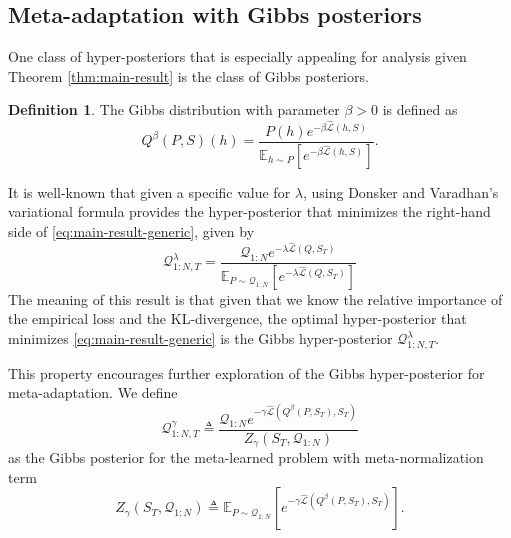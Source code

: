 \documentclass[letterpaper]{article} %
\theoremstyle{definition}
\newtheorem{defn}{Definition}[section]
\newcommand{\Expect}[2]{\mathbb{E}_{#1}\left [#2 \right ]}
\begin{document}

\subsection{Meta-adaptation with Gibbs posteriors} \label{sec:adapt-gibbs}

One class of hyper-posteriors that is especially appealing for analysis given Theorem \ref{thm:main-result} is the class of Gibbs posteriors.

\begin{defn} \label{defn:Gibbs}
	The Gibbs distribution with parameter $\beta>0$ is defined as 
	$$
	Q^\beta(P,S)(h)=\frac{P(h)e^{-\beta \hat{\mathcal{L}}(h,S)}}{\Expect{h\sim P}{e^{-\beta\hat{\mathcal{L}}(h,S)}}}.
	$$
\end{defn}

It is well-known \citep{Catoni2004} that given a specific value for $\lambda$, using Donsker and Varadhan’s variational formula \citep{Donsker1975} provides the hyper-posterior that minimizes the right-hand side of \eqref{eq:main-result-generic}, given by
%
\begin{equation*}
    \mathcal{Q}^{\lambda}_{1:N,T}=\frac{\mathcal{Q}_{1:N}e^{-\lambda\hat{\mathcal{L}}(Q,S_T)}}{\Expect{P\sim \mathcal{Q}_{1:N}}{e^{-\lambda\hat{\mathcal{L}}(Q,S_T)}}}
\end{equation*}
The meaning of this result is that given that we know the relative importance of the empirical loss and the KL-divergence, the optimal hyper-posterior that minimizes \eqref{eq:main-result-generic} is the Gibbs hyper-posterior $\mathcal{Q}^{\lambda}_{1:N,T}$.

This property encourages further exploration of the Gibbs hyper-posterior for meta-adaptation. We define 
\begin{equation} \label{eq:aml-post-defn}
\mathcal{Q}^{\gamma}_{1:N,T}\triangleq \frac{\mathcal{Q}_{1:N}e^{-\gamma\hat{\mathcal{L}}(Q^\beta(P,S_T),S_T)}}{Z_\gamma(S_T, \mathcal{Q}_{1:N})}
\end{equation} 
as the Gibbs posterior for the meta-learned problem with meta-normalization term $$Z_\gamma(S_T, \mathcal{Q}_{1:N})\triangleq \Expect{P\sim \mathcal{Q}_{1:N}}{e^{-\gamma\hat{\mathcal{L}}(Q^\beta(P,S_T),S_T)}}.$$
\end{document}
